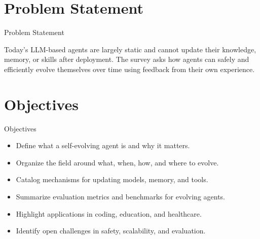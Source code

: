 \documentclass[10pt]{beamer}
\begin{document}
\section{Problem Statement}
\begin{frame}{Problem Statement}
  \begin{block}{}
  Today's LLM-based agents are largely static and cannot update their knowledge, memory, or skills after deployment. The survey asks how agents can safely and efficiently evolve themselves over time using feedback from their own experience.
  \end{block}
\end{frame}
\section{Objectives}
\begin{frame}{Objectives}
\begin{itemize}
  \item Define what a self-evolving agent is and why it matters.
  \item Organize the field around what, when, how, and where to evolve.
  \item Catalog mechanisms for updating models, memory, and tools.
  \item Summarize evaluation metrics and benchmarks for evolving agents.
  \item Highlight applications in coding, education, and healthcare.
  \item Identify open challenges in safety, scalability, and evaluation.
\end{itemize}
\end{frame}
\end{document}
